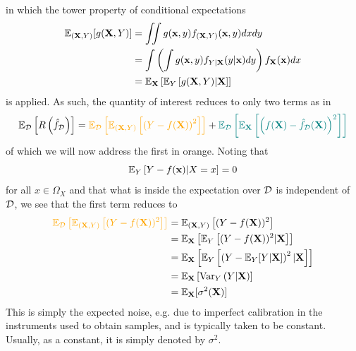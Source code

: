 \documentclass[11pt]{article}
\begin{document}
in which the tower property of conditional expectations
\begin{align*}
    \mathbb{E}_{(\mathbf{X},Y)}[g(\mathbf{X},Y)]
    &=
    \iint g(\mathbf{x},y)f_{(\mathbf{X},Y)}(\mathbf{x},y)dxdy\\
    &=
    \int \left(\int g(\mathbf{x},y)f_{Y|\mathbf{X}}(y|\mathbf{x})dy\right)f_{\mathbf{X}}(\mathbf{x})dx\\
    &=
    \mathbb{E}_{\mathbf{X}}\left[\mathbb{E}_{Y}\left[g(\mathbf{X},Y)|\mathbf{X}\right]\right]
\end{align*}
is applied. As such, the quantity of interest reduces to only two terms as in
$$
\E_{\D}\l[R\l(\hat{f}_{\D}\r)\r]
=
\textcolor{myYellow}{\E_{\D}\l[\E_{(\X,Y)}\l[\l(Y-f(\X)\r)^2\r]\r]}+\textcolor{myGreen}{\E_{\D}\l[\E_\X\l[\l(f(\X)-\hat{f}_{\D}(\X)\r)^2\r]\r]}
$$
of which we will now address the first in orange. Noting that
$$
\mathbb{E}_{Y}\left[Y-f(\mathbf{x})|X=x\right]
=
0
$$
for all $x\in\Omega_X$ and that what is inside the expectation over $\mathcal{D}$ is independent of $\mathcal{D}$, we see that the first term reduces to
\begin{align*}
    \textcolor{myYellow}{\E_{\D}\l[\E_{(\X,Y)}\l[(Y-f(\X))^2\r]\r]}
    &=
    \E_{(\X,Y)}\l[(Y-f(\X))^2\r]\\
    &=
    \E_\X\l[\E_{Y}\l[(Y-f(\X))^2|\X\r]\r]\\
    &=
    \E_\X\l[\E_{Y}\l[\l(Y-\E_Y[Y|\X]\r)^2|\X\r]\r]\\
    &=
    \E_\X\l[\text{Var}_Y\l(Y|\X\r)\r]\\
    &=
    \E_\X[\sigma^2(\X)]
\end{align*}
This is simply the expected noise, e.g. due to imperfect calibration in the instruments used to obtain samples, and is typically taken to be constant. Usually, as a constant, it is simply denoted by $\sigma^2$.
\end{document}
